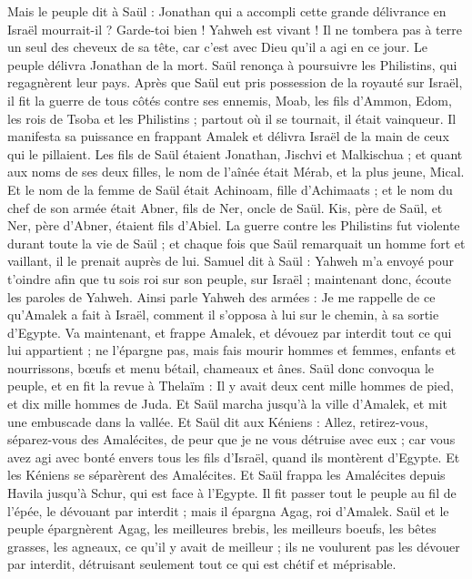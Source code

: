 \begin{multicols}{2}
Mais le peuple dit à Saül : Jonathan qui a accompli cette grande délivrance en Israël mourrait-il ? Garde-toi bien ! Yahweh est vivant ! Il ne tombera pas à terre un seul des cheveux de sa tête, car c'est avec Dieu qu'il a agi en ce jour. Le peuple délivra Jonathan de la mort.
Saül renonça à poursuivre les Philistins, qui regagnèrent leur pays.
Après que Saül eut pris possession de la royauté sur Israël, il fit la guerre de tous côtés contre ses ennemis, Moab, les fils d'Ammon, Edom, les rois de Tsoba et les Philistins ; partout où il se tournait, il était vainqueur.
Il manifesta sa puissance en frappant Amalek et délivra Israël de la main de ceux qui le pillaient.
Les fils de Saül étaient Jonathan, Jischvi et Malkischua ; et quant aux noms de ses deux filles, le nom de l'aînée était Mérab, et la plus jeune, Mical.
Et le nom de la femme de Saül était Achinoam, fille d'Achimaats ; et le nom du chef de son armée était Abner, fils de Ner, oncle de Saül.
Kis, père de Saül, et Ner, père d'Abner, étaient fils d'Abiel.
La guerre contre les Philistins fut violente durant toute la vie de Saül ; et chaque fois que Saül remarquait un homme fort et vaillant, il le prenait auprès de lui.
\VerseOne{}Samuel dit à Saül : Yahweh m'a envoyé pour t'oindre afin que tu sois roi sur son peuple, sur Israël ; maintenant donc, écoute les paroles de Yahweh.
Ainsi parle Yahweh des armées : Je me rappelle de ce qu'Amalek a fait à Israël, comment il s'opposa à lui sur le chemin, à sa sortie d'Egypte.
Va maintenant, et frappe Amalek, et dévouez par interdit tout ce qui lui appartient ; ne l'épargne pas, mais fais mourir hommes et femmes, enfants et nourrissons, bœufs et menu bétail, chameaux et ânes.
Saül donc convoqua le peuple, et en fit la revue à Thelaïm : Il y avait deux cent mille hommes de pied, et dix mille hommes de Juda.
Et Saül marcha jusqu'à la ville d'Amalek, et mit une embuscade dans la vallée.
Et Saül dit aux Kéniens : Allez, retirez-vous, séparez-vous des Amalécites, de peur que je ne vous détruise avec eux ; car vous avez agi avec bonté envers tous les fils d'Israël, quand ils montèrent d'Egypte. Et les Kéniens se séparèrent des Amalécites.
Et Saül frappa les Amalécites depuis Havila jusqu'à Schur, qui est face à l'Egypte.
Il fit passer tout le peuple au fil de l'épée, le dévouant par interdit ; mais il épargna Agag, roi d'Amalek.
Saül et le peuple épargnèrent Agag, les meilleures brebis, les meilleurs boeufs, les bêtes grasses, les agneaux, ce qu'il y avait de meilleur ; ils ne voulurent pas les dévouer par interdit, détruisant seulement tout ce qui est chétif et méprisable.

\end{multicols}
